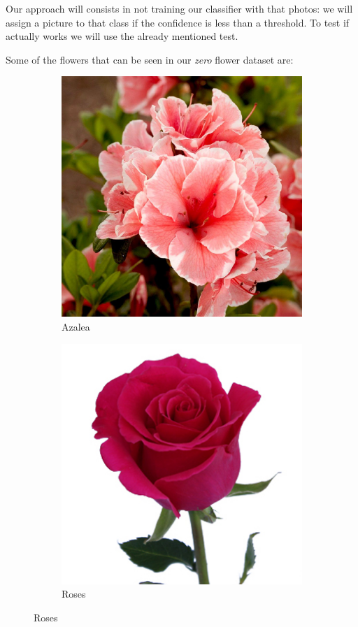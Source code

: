 \documentclass[11]{article}
\begin{document}
Our approach will consists in not training our classifier with that photos: we will assign a picture to that class if the confidence is less than a threshold. To test if actually works we will use the already mentioned test. 

Some of the flowers that can be seen in our \textit{zero} flower dataset are:
\begin{figure}[H]
    \begin{subfigure}[t]{0.45\textwidth}
    \centering
  \includegraphics[scale=0.13]{images/azalea.jpg}
    \caption{Azalea}
    \label{azalea}
    \end{subfigure}
    \begin{subfigure}[t]{0.45\textwidth}
    \centering
    \includegraphics[scale=0.35]{images/roses.jpg}
    \caption{Roses}
    \label{roses}
    \end{subfigure}
\end{figure}
\end{document}

